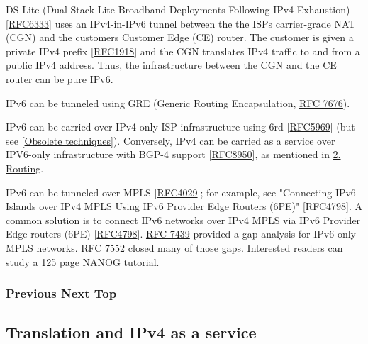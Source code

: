 \documentclass[
]{article}
\begin{document}
DS-Lite (Dual-Stack Lite Broadband Deployments Following IPv4
Exhaustion)
{[}\href{https://www.rfc-editor.org/info/rfc6333}{RFC6333}{]} uses an
IPv4-in-IPv6 tunnel between the the ISP\textquotesingle s carrier-grade
NAT (CGN) and the customer\textquotesingle s Customer Edge (CE) router.
The customer is given a private IPv4 prefix
{[}\href{https://www.rfc-editor.org/info/rfc1918}{RFC1918}{]} and the
CGN translates IPv4 traffic to and from a public IPv4 address. Thus, the
infrastructure between the CGN and the CE router can be pure IPv6.

IPv6 can be tunneled using GRE (Generic Routing Encapsulation,
\href{https://www.rfc-editor.org/info/rfc7676}{RFC 7676}).

IPv6 can be carried over IPv4-only ISP infrastructure using 6rd
{[}\href{https://www.rfc-editor.org/info/rfc5969}{RFC5969}{]} (but see
{[}\hyperref[obsolete-techniques]{Obsolete techniques}{]}). Conversely,
IPv4 can be carried as a service over IPV6-only infrastructure with
BGP-4 support
{[}\href{https://www.rfc-editor.org/info/rfc8950}{RFC8950}{]}, as
mentioned in
\href{https://github.com/becarpenter/book6/blob/main/02.\%20IPv6\%20Basic\%20Technology/Routing.md}{2.
Routing}.

IPv6 can be tunneled over MPLS
{[}\href{https://www.rfc-editor.org/info/rfc4029}{RFC4029}{]}; for
example, see "Connecting IPv6 Islands over IPv4 MPLS Using IPv6 Provider
Edge Routers (6PE)"
{[}\href{https://www.rfc-editor.org/info/rfc4798}{RFC4798}{]}. A common
solution is to connect IPv6 networks over IPv4 MPLS via IPv6 Provider
Edge routers (6PE)
{[}\href{https://www.rfc-editor.org/info/rfc4798}{RFC4798}{]}.
\href{https://www.rfc-editor.org/info/rfc7439}{RFC 7439} provided a gap
analysis for IPv6-only MPLS networks.
\href{https://www.rfc-editor.org/info/rfc7552}{RFC 7552} closed many of
those gaps. Interested readers can study a 125 page
\href{https://pc.nanog.org/static/published/meetings/NANOG76/1993/20190612_Agahian_Demystifying_Ipv6_Over_v1.pdf}{NANOG
tutorial}.

\subsubsection{\texorpdfstring{\hyperref[dual-stack-scenarios]{Previous}
\hyperref[translation-and-ipv4-as-a-service]{Next}
\hyperref[coexistence-with-legacy-ipv4]{Top}}{Previous Next Top}}\label{previous-next-top-20}

\pagebreak

\subsection{Translation and IPv4 as a
service}\label{translation-and-ipv4-as-a-service}
\end{document}
